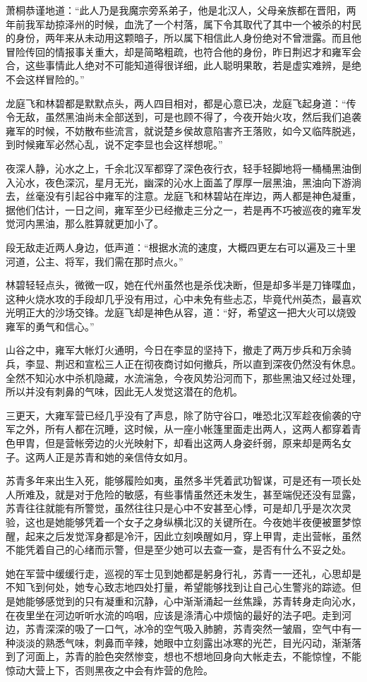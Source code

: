 萧桐恭谨地道：“此人乃是我魔宗旁系弟子，他是北汉人，父母亲族都在晋阳，两年前我军劫掠泽州的时候，血洗了一个村落，属下令其取代了其中一个被杀的村民的身份，两年来从未动用这颗暗子，所以属下相信此人身份绝对不曾泄露。而且他冒险传回的情报事关重大，却是简略粗疏，也符合他的身份，昨日荆迟才和雍军会合，这些事情此人绝对不可能知道得很详细，此人聪明果敢，若是虚实难辨，是绝不会这样冒险的。”

龙庭飞和林碧都是默默点头，两人四目相对，都是心意已决，龙庭飞起身道：“传令无敌，虽然黑油尚未全部送到，可是也顾不得了，今夜开始火攻，然后我们追袭雍军的时候，不妨散布些流言，就说楚乡侯故意陷害齐王落败，如今又临阵脱逃，到时候雍军必然心乱，说不定李显也会这样想呢。”

夜深人静，沁水之上，千余北汉军都穿了深色夜行衣，轻手轻脚地将一桶桶黑油倒入沁水，夜色深沉，星月无光，幽深的沁水上面盖了厚厚一层黑油，黑油向下游淌去，丝毫没有引起谷中雍军的注意。龙庭飞和林碧站在岸边，两人都是神色凝重，据他们估计，一日之间，雍军至少已经撤走三分之一，若是再不巧被巡夜的雍军发觉河内黑油，那么胜算就更加小了。

段无敌走近两人身边，低声道：“根据水流的速度，大概四更左右可以遍及三十里河道，公主、将军，我们需在那时点火。”

林碧轻轻点头，微微一叹，她在代州虽然也是杀伐决断，但是却多半是刀锋喋血，这种火烧水攻的手段却几乎没有用过，心中未免有些忐忑，毕竟代州英杰，最喜欢光明正大的沙场交锋。龙庭飞却是神色从容，道：“好，希望这一把大火可以烧毁雍军的勇气和信心。”

山谷之中，雍军大帐灯火通明，今日在李显的坚持下，撤走了两万步兵和万余骑兵，李显、荆迟和宣松三人正在彻夜商讨如何撤兵，所以直到深夜仍然没有休息。全然不知沁水中杀机隐藏，水流湍急，今夜风势沿河而下，那些黑油又经过处理，所以并没有刺鼻的气味，因此无人发觉这潜在的危机。

三更天，大雍军营已经几乎没有了声息，除了防守谷口，唯恐北汉军趁夜偷袭的守军之外，所有人都在沉睡，这时候，从一座小帐篷里面走出两人，这两人都穿着青色甲胄，但是营帐旁边的火光映射下，却看出这两人身姿纤弱，原来却是两名女子。这两人正是苏青和她的亲信侍女如月。

苏青多年来出生入死，能够履险如夷，虽然多半凭着武功智谋，可是还有一项长处人所难及，就是对于危险的敏感，有些事情虽然还未发生，甚至端倪还没有显露，苏青往往就能有所警觉，虽然往往只是心中不安甚至心悸，可是却几乎是次次灵验，这也是她能够凭着一个女子之身纵横北汉的关键所在。今夜她半夜便被噩梦惊醒，起来之后发觉浑身都是冷汗，因此立刻唤醒如月，穿上甲胄，走出营帐，虽然不能凭着自己的心绪而示警，但是至少她可以去查一查，是否有什么不妥之处。

她在军营中缓缓行走，巡视的军士见到她都是躬身行礼，苏青一一还礼，心思却是不知飞到何处，她专心致志地四处打量，希望能够找到让自己心生警兆的踪迹。但是她能够感觉到的只有凝重和沉静，心中渐渐涌起一丝焦躁，苏青转身走向沁水，在夜里坐在河边听听水流的呜咽，应该是涤清心中烦恼的最好的法子吧。走到河边，苏青深深的吸了一口气，冰冷的空气吸入肺腑，苏青突然一皱眉，空气中有一种淡淡的熟悉气味，刺鼻而辛辣，她眼中立刻露出冰寒的光芒，目光闪动，渐渐落到了河面上，苏青的脸色突然惨变，想也不想地回身向大帐走去，不能惊惶，不能惊动大营上下，否则黑夜之中会有炸营的危险。

